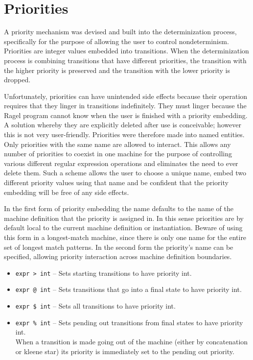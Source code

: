 \documentclass[letterpaper,11pt,oneside]{book}
\begin{document}
\section{Priorities}

A priority mechanism was devised and built into the determinization
process, specifically for the purpose of allowing the user to control
nondeterminism.  Priorities are integer values embedded into transitions. When
the determinization process is combining transitions that have different
priorities, the transition with the higher priority is preserved and the
transition with the lower priority is dropped.

Unfortunately, priorities can have unintended side effects because their
operation requires that they linger in transitions indefinitely. They must linger
because the Ragel program cannot know when the user is finished with a priority
embedding.  A solution whereby they are explicitly deleted after use is
conceivable; however this is not very user-friendly.  Priorities were therefore
made into named entities. Only priorities with the same name are allowed to
interact.  This allows any number of priorities to coexist in one machine for
the purpose of controlling various different regular expression operations and
eliminates the need to ever delete them. Such a scheme allows the user to
choose a unique name, embed two different priority values using that name
and be confident that the priority embedding will be free of any side effects.

In the first form of priority embedding the name defaults to the name of the machine
definition that the priority is assigned in. In this sense priorities are by
default local to the current machine definition or instantiation. Beware of
using this form in a longest-match machine, since there is only one name for
the entire set of longest match patterns. In the second form the priority's
name can be specified, allowing priority interaction across machine definition
boundaries.

\begin{itemize}
\setlength{\parskip}{0in}
\item \verb|expr > int| -- Sets starting transitions to have priority int.
\item \verb|expr @ int| -- Sets transitions that go into a final state to have priority int. 
\item \verb|expr $ int| -- Sets all transitions to have priority int.
\item \verb|expr % int| -- Sets pending out transitions from final states to
have priority int.\\ When a transition is made going out of the machine (either
by concatenation or kleene star) its priority is immediately set to the pending
out priority.  
\end{itemize}
\end{document}
